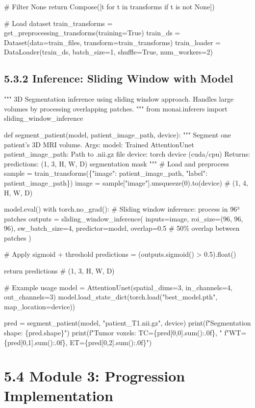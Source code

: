     \# Filter None
    return Compose([t for t in transforms if t is not None])

\# Load dataset
train\_transforms = get\_preprocessing\_transforms(training=True)
train\_ds = Dataset(data=train\_files, transform=train\_transforms)
train\_loader = DataLoader(train\_ds, batch\_size=1, shuffle=True, num\_workers=2)


\subsection{5.3.2 Inference: Sliding Window with Model}
"""
3D Segmentation inference using sliding window approach.
Handles large volumes by processing overlapping patches.
"""
from monai.inferers import sliding\_window\_inference

def segment\_patient(model, patient\_image\_path, device):
    """
    Segment one patient's 3D MRI volume.
    Args:
        model: Trained AttentionUnet
        patient\_image\_path: Path to .nii.gz file
        device: torch device (cuda/cpu)
    Returns:
        predictions: (1, 3, H, W, D) segmentation mask
    """
    \# Load and preprocess
    sample = train\_transforms(\{"image": patient\_image\_path, 
                              "label": patient\_image\_path\})
    image = sample["image"].unsqueeze(0).to(device)  \# (1, 4, H, W, D)
    
    model.eval()
    with torch.no\_grad():
        \# Sliding window inference: process in 96³ patches
        outputs = sliding\_window\_inference(
            inputs=image,
            roi\_size=(96, 96, 96),
            sw\_batch\_size=4,
            predictor=model,
            overlap=0.5  \# 50\% overlap between patches
        )
        
        \# Apply sigmoid + threshold
        predictions = (outputs.sigmoid() > 0.5).float()
    
    return predictions  \# (1, 3, H, W, D)

\# Example usage
model = AttentionUnet(spatial\_dims=3, in\_channels=4, out\_channels=3)
model.load\_state\_dict(torch.load("best\_model.pth", map\_location=device))

pred = segment\_patient(model, "patient\_T1.nii.gz", device)
print(f"Segmentation shape: \{pred.shape\}")
print(f"Tumor voxels: TC=\{pred[0,0].sum():.0f\}, "
      f"WT=\{pred[0,1].sum():.0f\}, ET=\{pred[0,2].sum():.0f\}")


\section{5.4 Module 3: Progression Implementation}

